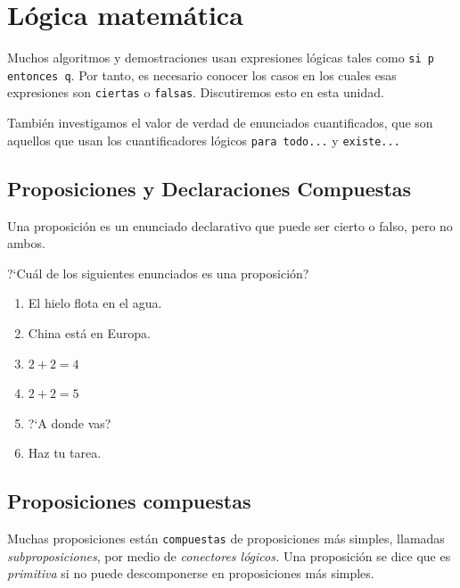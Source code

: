 \section{Lógica matemática}


    Muchos algoritmos y demostraciones usan expresiones lógicas tales como
    \texttt{si p entonces q}. Por tanto, es necesario conocer los casos en los cuales esas expresiones son \texttt{ciertas} o \texttt{falsas}. Discutiremos esto en esta unidad.

    También investigamos el valor de verdad de enunciados cuantificados, que son aquellos que usan los cuantificadores lógicos \texttt{para todo...} y \texttt{existe...}



\subsection{Proposiciones y Declaraciones Compuestas}

    Una proposición es un enunciado declarativo que puede ser cierto o falso, pero no ambos.

    \begin{resuelto}
        ?`Cuál de los siguientes enunciados es una proposición?
        \begin{multicols}{2}
            \begin{enumerate}
                \item El hielo flota en el agua.
                \item China está en Europa.
                \item $2+2=4$
                \item $2+2=5$
                \item ?`A donde vas?
                \item Haz tu tarea.
            \end{enumerate}
        \end{multicols}
    \end{resuelto}



\subsection{Proposiciones compuestas}


    Muchas proposiciones están \texttt{compuestas} de proposiciones más simples, llamadas \emph{subproposiciones}, por medio de \emph{conectores lógicos.}  Una proposición se dice que es \emph{primitiva} si no puede descomponerse en proposiciones más simples.



